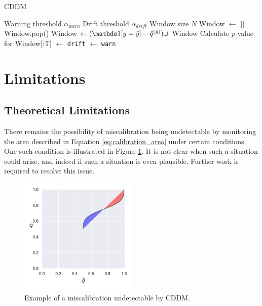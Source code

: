 \begin{algorithm}
    \caption{CDDM}
    \label{alg:cddm_basic}
    \begin{algorithmic}
        \Require Warning threshold $\alpha_{warn}$
        \Require Drift threshold $\alpha_{drift}$
        \Require Window size $N$
        \State Window $\gets$ []
            \State Window.pop()
	    \State Window $\gets (\id{y=\hat{y}} - \qhatyhat) \cup$ Window
                \State Calculate $p$ value for Window[:T]
                     $\gets$ {\tt drift}
                     $\gets$ {\tt warn}
                \EndIf
            \EndFor
        \EndFor
    \end{algorithmic}
\end{algorithm}


\section{Limitations} \label{CDDM:limitations}

\subsection{Theoretical Limitations}

There remains the possibility of miscalibration being undetectable by monitoring the area described in Equation \ref{eq:calibration_area} under certain conditions. One such condition is illustrated in Figure \ref{fig:weird_calibration}. It is not clear when such a situation could arise, and indeed if such a situation is even plausible. Further work is required to resolve this issue.

\begin{figure}
    \centering
    \includegraphics[width=0.5\textwidth]{images/cddm_area2.pdf}
    \caption{Example of a miscalibration undetectable by CDDM.}
    \label{fig:weird_calibration}
\end{figure}


